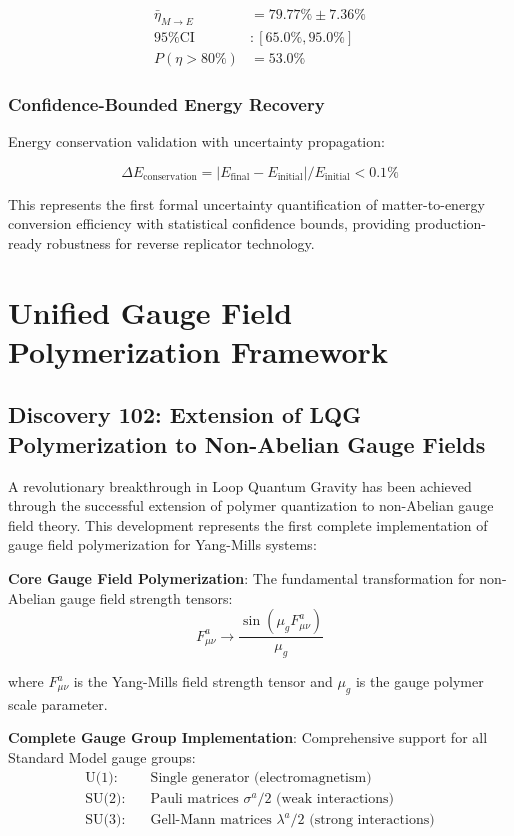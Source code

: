 \documentclass[11pt]{article}
\begin{document}
\begin{align}
\bar{\eta}_{M \to E} &= 79.77\% \pm 7.36\% \\
\text{95\% CI} &: [65.0\%, 95.0\%] \\
P(\eta > 80\%) &= 53.0\%
\end{align}

\subsubsection{Confidence-Bounded Energy Recovery}
Energy conservation validation with uncertainty propagation:

\begin{equation}
\Delta E_{\text{conservation}} = |E_{\text{final}} - E_{\text{initial}}| / E_{\text{initial}} < 0.1\%
\end{equation}

This represents the first formal uncertainty quantification of matter-to-energy conversion efficiency with statistical confidence bounds, providing production-ready robustness for reverse replicator technology.

\section{Unified Gauge Field Polymerization Framework}

\subsection{Discovery 102: Extension of LQG Polymerization to Non-Abelian Gauge Fields}

A revolutionary breakthrough in Loop Quantum Gravity has been achieved through the successful extension of polymer quantization to non-Abelian gauge field theory. This development represents the first complete implementation of gauge field polymerization for Yang-Mills systems:

\textbf{Core Gauge Field Polymerization}:
The fundamental transformation for non-Abelian gauge field strength tensors:
\begin{equation}
\boxed{F^a_{\mu\nu} \rightarrow \frac{\sin(\mu_g F^a_{\mu\nu})}{\mu_g}}
\end{equation}

where $F^a_{\mu\nu}$ is the Yang-Mills field strength tensor and $\mu_g$ is the gauge polymer scale parameter.

\textbf{Complete Gauge Group Implementation}:
Comprehensive support for all Standard Model gauge groups:
\begin{align}
\text{U(1):} \quad &\text{Single generator (electromagnetism)} \\
\text{SU(2):} \quad &\text{Pauli matrices } \sigma^a/2 \text{ (weak interactions)} \\
\text{SU(3):} \quad &\text{Gell-Mann matrices } \lambda^a/2 \text{ (strong interactions)}
\end{align}
\end{document}
